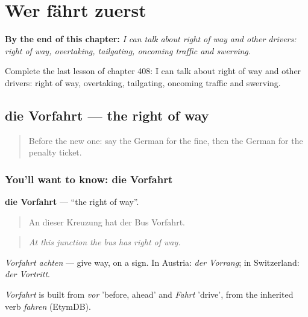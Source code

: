
\chapter{Wer fährt zuerst}
\label{ch:ge-wer-fahrt-zuerst}

\begin{chapteropening}
\textbf{By the end of this chapter:} \emph{I can talk about right of way and other drivers: right of way, overtaking, tailgating, oncoming traffic and swerving.}

Complete the last lesson of chapter 408: I can talk about right of way and other drivers: right of way, overtaking, tailgating, oncoming traffic and swerving.
\end{chapteropening}

\section[die Vorfahrt]{die Vorfahrt — the right of way}

\label{lesson:GE-C408-vorfahrt}



\begin{quote}
Before the new one: say the German for the fine, then the German for the penalty ticket.
\end{quote}

\subsection*{You'll want to know: die Vorfahrt}
\textbf{die Vorfahrt} — \textquotedblleft{}the right of way\textquotedblright{}.

\begin{quote}
An dieser Kreuzung hat der Bus Vorfahrt.
\end{quote}

\begin{quote}
\emph{At this junction the bus has right of way.}
\end{quote}

\emph{Vorfahrt achten} — give way, on a sign. In Austria: \emph{der Vorrang}; in Switzerland: \emph{der Vortritt}.

\begin{cousinweb}
\emph{Vorfahrt} is built from \emph{vor} 'before, ahead' and \emph{Fahrt} 'drive', from the inherited verb \emph{fahren} (EtymDB).
\end{cousinweb}

